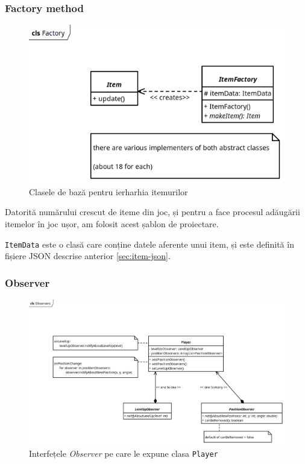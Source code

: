 \documentclass{article}
\begin{document}
    \subsubsection{Factory method}
    \begin{figure}[H]
        \includegraphics[width=\textwidth]{factory-diagram}
        \centering
        \caption{Clasele de bază pentru ierharhia itemurilor}
    \end{figure}

    Datorită numărului crescut de iteme din joc, și pentru a face procesul adăugării itemelor în joc
    ușor, am folosit acest șablon de proiectare.

    \texttt{ItemData} este o clasă care conține datele aferente unui item, și este definită în
    fișiere JSON descrise anterior \ref{sec:item-json}.

    \subsubsection{Observer}
    \begin{figure}[H]
        \includegraphics[width=\textwidth]{observers-diagram}
        \centering
        \caption{Interfețele \emph{Observer} pe care le expune clasa \texttt{Player}}
    \end{figure}
\end{document}
